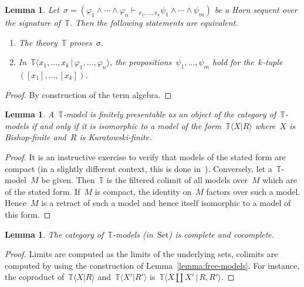 \documentclass[oneside,reqno]{amsart}
\theoremstyle{definition}
\theoremstyle{plain}
\newtheorem{lemma}[defn]{Lemma}
\theoremstyle{remark}
\newcommand{\TT}{\mathbb{T}}
\newcommand{\Set}{\mathrm{Set}}
\renewcommand{\_}{\mathpunct{.}\,}
\newcommand{\?}{\,{:}\,}
\newcommand{\seq}[1]{\mathrel{\vdash\!\!\!_{#1}}}
\begin{document}
\begin{lemma}Let~$\sigma = (\varphi_1 \wedge \cdots \wedge \varphi_n
\seq{x_1,\ldots,x_k} \psi_1 \wedge \cdots \wedge \psi_m)$ be a Horn sequent
over the signature of~$\TT$. Then the following statements are equivalent.
\begin{enumerate}
\item The theory~$\TT$ proves~$\sigma$. \smallskip
\item In~$\TT\langle x_1,\ldots,x_k \,|\, \varphi_1,\ldots,\varphi_n \rangle$, the
propositions~$\psi_1,\ldots,\psi_m$ hold for
the~$k$-tuple~$([x_1],\ldots,[x_k])$.
\end{enumerate}
\end{lemma}

\begin{proof}By construction of the term algebra.\end{proof}

\begin{lemma}\label{lemma:char-fp-models}
A~$\TT$-model is finitely presentable as an object of the category
of~$\TT$-models if and only if it is isomorphic to a model of the
form~$\TT\langle X | R \rangle$ where~$X$ is Bishop-finite and~$R$ is
Kuratowski-finite.
\end{lemma}

\begin{proof}It is an instructive exercise to verify that models of the stated
form are compact (in a slightly different context, this is done
in~\cite[Theorem~3.12]{adamek-rosicky:presentable}). Conversely, let
a~$\TT$-model~$M$ be given. Then~$\TT$ is the
filtered colimit of all models over~$M$ which are of the stated form. If~$M$ is
compact, the identity on~$M$ factors over such a model. Hence~$M$ is a
retract of such a model and hence itself isomorphic to a model of this form.
\end{proof}

\begin{lemma}The category of~$\TT$-models (in~$\Set$) is complete and
cocomplete.\end{lemma}

\begin{proof}Limits are computed as the limits of the underlying sets, colimits
are computed by using the construction of Lemma~\ref{lemma:free-models}. For
instance, the coproduct of~$\TT\langle X | R \rangle$ and~$\TT\langle X' | R'
\rangle$ is~$\TT\langle X \amalg X' \,|\, R, R' \rangle$.\end{proof}
\end{document}
